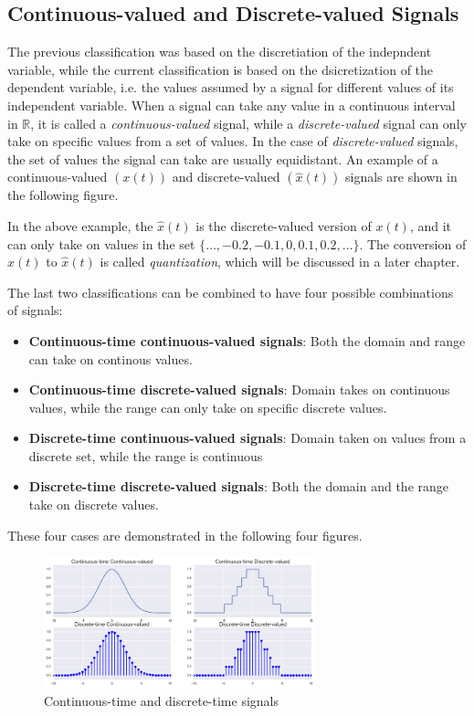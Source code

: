 \subsection{Continuous-valued and Discrete-valued Signals}
The previous classification was based on the discretiation of the indepndent variable, while the current classification is based on the dsicretization of the dependent variable, i.e. the values assumed by a signal for different values of its independent variable. When a signal can take  any value in a continuous interval in $\mathbb{R}$, it is called a \textit{continuous-valued} signal, while a \textit{discrete-valued} signal can only take on specific values from a set of values. In the case of \textit{discrete-valued} signals, the set of values the signal can take are usually equidistant. An example of a continuous-valued $\left(x\left(t\right)\right)$ and discrete-valued $\left(\hat{x}\left(t\right)\right)$ signals are shown in the following figure.

In the above example, the $\hat{x}\left(t\right)$ is the discrete-valued version of $x\left(t\right)$, and it can only take on values in the set $\{\dotsc, -0.2, -0.1, 0, 0.1, 0.2, \dotsc\}$. The conversion of $x\left(t\right)$ to $\hat{x}\left(t\right)$ is called \textit{quantization}, which will be discussed in a later chapter.

The last two classifications can be combined to have four possible combinations of signals:
\begin{itemize}
    \item \textbf{Continuous-time continuous-valued signals}: Both the domain and range can take on continous values.
    \item \textbf{Continuous-time discrete-valued signals}: Domain takes on continuous values, while the range can only take on specific discrete values.
    \item \textbf{Discrete-time continuous-valued signals}: Domain taken on values from a discrete set, while the range is continuous
    \item \textbf{Discrete-time discrete-valued signals}: Both the domain and the range take on discrete values.
\end{itemize}

These four cases are demonstrated in the following four figures.

\begin{figure}[h!]
\centering
    \includegraphics[width=0.7\textwidth]{figs/full-classify.png}
    \caption{Continuous-time and discrete-time signals} \label{fig:ch2_full}
\end{figure}

